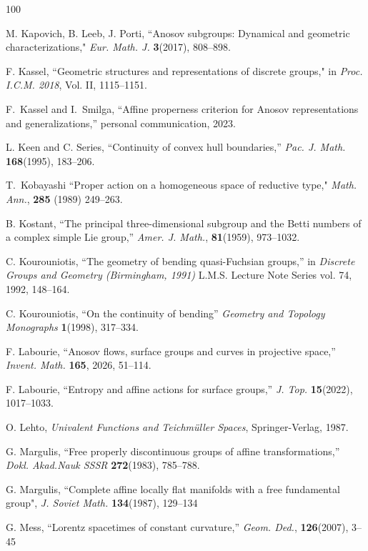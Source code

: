 \documentclass{amsart}
\theoremstyle{plain}
\theoremstyle{definition}
\theoremstyle{remark}
\newcommand{\<}{\left <}
\renewcommand{\>}{\right >}
\begin{document}
\begin{thebibliography}{100}
\begin{scriptsize}
 M. Kapovich, B. Leeb, J. Porti, ``Anosov subgroups: Dynamical and geometric characterizations," {\em Eur. Math. J.} {\bf 3}(2017), 808--898.


 F. Kassel, ``Geometric structures and representations of discrete groups," in {\em Proc. I.C.M. 2018}, Vol. II, 1115--1151.


F.~Kassel and I.~Smilga, ``Affine properness criterion for $\mathrm{A}$nosov representations and generalizations,''
personal communication, 2023.

 L. Keen and C. Series, ``Continuity of convex hull boundaries,'' {\em Pac. J. Math.} {\bf 168}(1995), 183--206.



T.~Kobayashi ``Proper action on a homogeneous space of reductive type," {\em Math. Ann.}, {\bf 285 }(1989) 249--263.


 B. Kostant, ``The principal three-dimensional subgroup and the Betti numbers of a complex simple Lie group,'' 
{\em Amer. J. Math.}, {\bf 81}(1959), 973--1032.

 C. Kourouniotis, ``The geometry of bending quasi-Fuchsian groups,'' in {\em Discrete Groups and Geometry (Birmingham, 1991)}
 L.M.S. Lecture Note Series vol. 74, 1992, 148--164.


 C. Kourouniotis, ``On the continuity of bending''
{\em Geometry and Topology Monographs}  {\bf 1}(1998), 317--334.


 F. Labourie, ``Anosov flows, surface groups and curves in projective space,''
{\em Invent. Math.} {\bf 165}, 2026,  51--114.



 F. Labourie, ``Entropy and affine actions for surface groups,''
{\em J. Top.} {\bf 15}(2022),  1017--1033.

 O. Lehto, {\em Univalent Functions and Teichm\"uller Spaces}, Springer-Verlag, 1987.

 G. Margulis, ``Free properly discontinuous groups of affine transformations,''
{\em Dokl. Akad.Nauk SSSR} {\bf 272}(1983), 785--788. 

 G. Margulis, ``Complete affine locally flat manifolds with a free fundamental group", {\em J.
Soviet Math.} {\bf 134}(1987), 129--134 
 
  G. Mess, ``Lorentz spacetimes of constant curvature,'' {\em Geom. Ded.}, {\bf 126}(2007), 3--45


\end{scriptsize}
\end{thebibliography}
\end{document}

